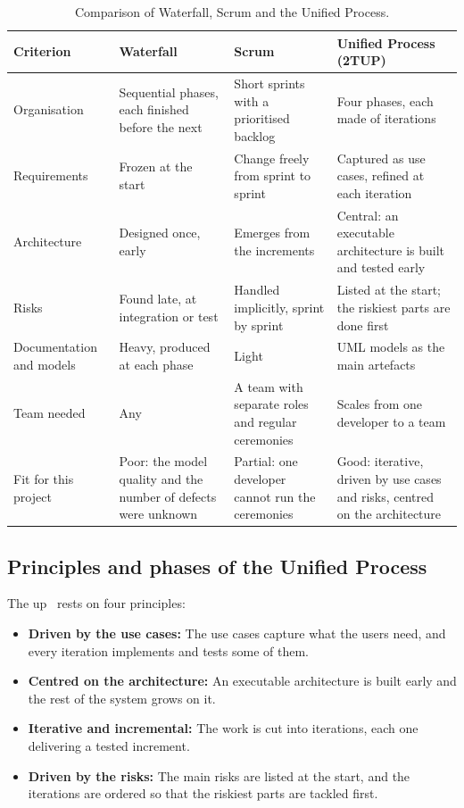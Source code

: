 \begin{table}[H]
\centering
\small
\caption{Comparison of Waterfall, Scrum and the Unified Process.}
\label{tab:methodology-comparison}
\begin{tabularx}{\textwidth}{|P{2.7cm}|Y|Y|Y|}
\hline
\textbf{Criterion} & \textbf{Waterfall} & \textbf{Scrum} & \textbf{Unified Process (2TUP)} \\
\hline
Organisation & Sequential phases, each finished before the next & Short sprints with a prioritised backlog & Four phases, each made of iterations \\
\hline
Requirements & Frozen at the start & Change freely from sprint to sprint & Captured as use cases, refined at each iteration \\
\hline
Architecture & Designed once, early & Emerges from the increments & Central: an executable architecture is built and tested early \\
\hline
Risks & Found late, at integration or test & Handled implicitly, sprint by sprint & Listed at the start; the riskiest parts are done first \\
\hline
Documentation and models & Heavy, produced at each phase & Light & UML models as the main artefacts \\
\hline
Team needed & Any & A team with separate roles and regular ceremonies & Scales from one developer to a team \\
\hline
Fit for this project & Poor: the model quality and the number of defects were unknown & Partial: one developer cannot run the ceremonies & Good: iterative, driven by use cases and risks, centred on the architecture \\
\hline
\end{tabularx}
\end{table}

\subsection{Principles and phases of the Unified Process}

The \gls{up}~\cite{jacobson1999unified,kruchten2003rup} rests on four principles:

\begin{itemize}
    \item \textbf{Driven by the use cases:} The use cases capture what the users need, and every iteration implements and tests some of them.
    \item \textbf{Centred on the architecture:} An executable architecture is built early and the rest of the system grows on it.
    \item \textbf{Iterative and incremental:} The work is cut into iterations, each one delivering a tested increment.
    \item \textbf{Driven by the risks:} The main risks are listed at the start, and the iterations are ordered so that the riskiest parts are tackled first.
\end{itemize}

